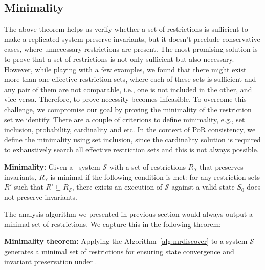 \subsection{Minimality}
The above theorem helps us verify whether a set of restrictions is sufficient to
make a replicated system preserve invariants,
but it doesn't preclude conservative cases, where unnecessary restrictions are
present. The most promising solution is to prove that
a set of restrictions is not only sufficient but also necessary. However, while
playing with a few examples, we found that there might exist
more than one effective restriction sets, where each of these sets is sufficient and
any pair of them are not comparable, i.e., one is not included in the other, and
vice versa. Therefore, to prove necessity becomes infeasible. To overcome this challenge,
we compromise our goal by proving the minimality of the restriction set
we identify. There are a couple of criterions to define minimality, e.g.,
set inclusion, probability, cardinality and etc. In the context of
PoR consistency, we define the minimality using set inclusion,
since the cardinality solution is required to exhaustively search all effective restriction
sets and this is not always possible.

\begin{mydef}
{\bf Minimality:} Given a \PRCAJ\ system $\mathscr{S}$
with a set of restrictions
$R_{\mathscr{S}}$ that preserves invariants, $R_{\mathscr{S}}$ is minimal if the
following condition is met:
for any restriction sets $R'$ such that $R' \subsetneq R_{\mathscr{S}}$,
there exists an execution of $\mathscr{S}$ against a valid state $S_0$ does not
preserve invariants.
\label{def:minimal}
\end{mydef}

The analysis algorithm we presented in previous section would always output a minimal set
of restrictions. We capture this in the following theorem:

\begin{theorem}
\label{them:minimality}
{\bf Minimality theorem:} Applying the Algorithm~\ref{alg:mrdiscover} to a system $\mathscr{S}$ generates
a minimal set of restrictions for ensuring state convergence and invariant preservation
under \PRCN.
\end{theorem}

